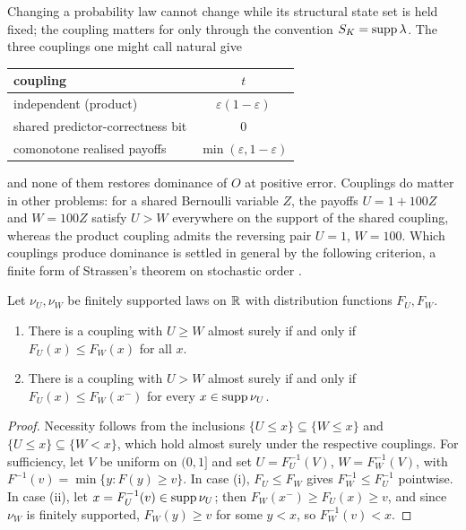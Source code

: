 Changing a probability law cannot change  while its structural state set is held fixed; the
coupling matters for  only through the convention $S_K=\operatorname{supp}\lambda$. The three couplings one
might call natural give
\begin{center}
\small
\begin{tabular}{@{}lc@{}}
  \toprule
  coupling & $t$ \\
  \midrule
  independent (product) & $\varepsilon(1-\varepsilon)$ \\
  shared predictor-correctness bit & $0$ \\
  comonotone realised payoffs & $\min(\varepsilon,1-\varepsilon)$ \\
  \bottomrule
\end{tabular}
\end{center}
and none of them restores dominance of $O$ at positive error. Couplings do matter in other problems:
for a shared Bernoulli variable $Z$, the payoffs $U=1+100Z$ and $W=100Z$ satisfy $U>W$ everywhere on
the support of the shared coupling, whereas the product coupling admits the reversing pair $U=1$,
$W=100$. Which couplings produce dominance is settled in general by the following criterion, a
finite form of Strassen's theorem on stochastic order \autocite{strassen1965}.

\begin{proposition}\label{prop:strassen}
Let $\nu_U,\nu_W$ be finitely supported laws on $\mathbb{R}$ with distribution functions $F_U,F_W$.
\begin{enumerate}[label=(\roman*)]
  \item There is a coupling with $U\ge W$ almost surely if and only if $F_U(x)\le F_W(x)$ for all $x$.
  \item There is a coupling with $U>W$ almost surely if and only if $F_U(x)\le F_W(x^-)$ for every
        $x\in\operatorname{supp}\nu_U$.
\end{enumerate}
\end{proposition}

\begin{proof}
Necessity follows from the inclusions $\{U\le x\}\subseteq\{W\le x\}$ and
$\{U\le x\}\subseteq\{W<x\}$, which hold almost surely under the respective couplings. For
sufficiency, let $V$ be uniform on $(0,1]$ and set $U=F_U^{-1}(V)$, $W=F_W^{-1}(V)$, with
$F^{-1}(v)=\min\{y:F(y)\ge v\}$. In case (i), $F_U\le F_W$ gives $F_W^{-1}\le F_U^{-1}$ pointwise.
In case (ii), let $x=F_U^{-1}(v)\in\operatorname{supp}\nu_U$; then $F_W(x^-)\ge F_U(x)\ge v$, and since $\nu_W$ is
finitely supported, $F_W(y)\ge v$ for some $y<x$, so $F_W^{-1}(v)<x$.
\end{proof}


